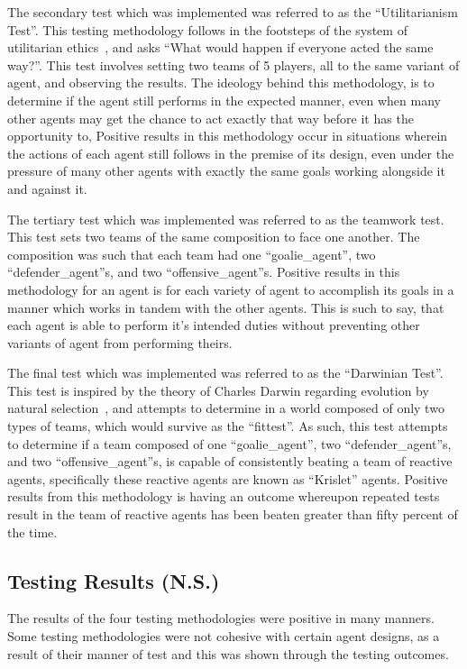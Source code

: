 \documentclass[conference]{IEEEtran}
\begin{document}
The secondary test which was implemented was referred to as the ``Utilitarianism Test''.
This testing methodology follows in the footsteps of the system of utilitarian ethics~\cite{b1}, and asks ``What would happen if everyone acted the same way?''.
This test involves setting two teams of 5 players, all to the same variant of agent, and observing the results.
The ideology behind this methodology, is to determine if the agent still performs in the expected manner, even when many other agents may get the chance to act exactly that way before it has the opportunity to,
Positive results in this methodology occur in situations wherein the actions of each agent still follows in the premise of its design, even under the pressure of many other agents with exactly the same goals working alongside it and against it.

The tertiary test which was implemented was referred to as the teamwork test.
This test sets two teams of the same composition to face one another.
The composition was such that each team had one ``goalie\_agent'', two ``defender\_agent''s, and two ``offensive\_agent''s.
Positive results in this methodology for an agent is for each variety of agent to accomplish its goals in a manner which works in tandem with the other agents.
This is such to say, that each agent is able to perform it's intended duties without preventing other variants of agent from performing theirs.

The final test which was implemented was referred to as the ``Darwinian Test''.
This test is inspired by the theory of Charles Darwin regarding evolution by natural selection~\cite{b2}, and attempts to determine in a world composed of only two types of teams, which would survive as the ``fittest''.
As such, this test attempts to determine if a team composed of one ``goalie\_agent'', two ``defender\_agent''s, and two ``offensive\_agent''s, is capable of consistently beating a team of reactive agents, specifically these reactive agents are known as ``Krislet'' agents.
Positive results from this methodology is having an outcome whereupon repeated tests result in the team of reactive agents has been beaten greater than fifty percent of the time.

\subsection{Testing Results (N.S.)}
The results of the four testing methodologies were positive in many manners.
Some testing methodologies were not cohesive with certain agent designs, as a result of their manner of test and this was shown through the testing outcomes.
\end{document}
